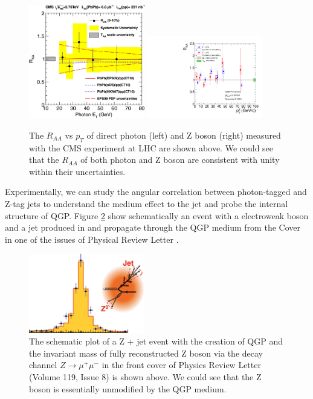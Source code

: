  \begin{figure}[hbtp]
\begin{center}
\includegraphics[width=0.45\textwidth]{Figures/Chapter1/GammaRAA.jpg}
\includegraphics[width=0.45\textwidth]{Figures/Chapter1/ZRAA.pdf}

\caption{The $R_{AA}$ vs $p_T$ of direct photon (left) and Z boson (right) measured with the CMS experiment at LHC are shown above. We could see that the $R_{AA}$ of both photon and Z boson are consistent with unity within their uncertainties.}
\label{PhoZV2Ref}
\end{center}
\end{figure}   

Experimentally, we can study the angular correlation between photon-tagged and Z-tag jets to understand the medium effect to the jet and probe the internal structure of QGP. Figure \ref{BosonTagJet} show schematically an event with a electroweak boson and a jet produced in and propagate through the QGP medium from the Cover in one of the issues of Physical Review Letter \cite{PRLCover}.

 \begin{figure}[hbtp]
\begin{center}
\includegraphics[width=0.45\textwidth]{Figures/Chapter1/ZTagJet.png}
\caption{The schematic plot of a Z + jet event with the creation of QGP and the invariant mass of fully reconstructed Z boson via the decay channel $Z \rightarrow \mu^+ \mu^-$ in the front cover of Physics Review Letter (Volume 119, Issue 8) is shown above. We could see that the Z boson is essentially unmodified by the QGP medium.}
\label{BosonTagJet}
\end{center}
\end{figure}   

